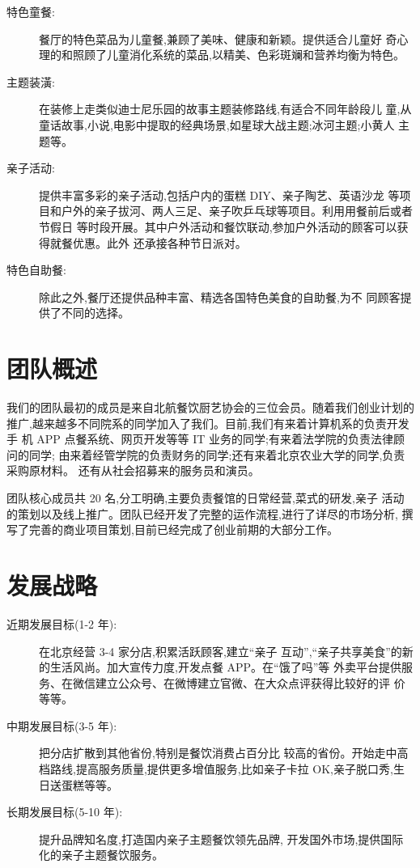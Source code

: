 \begin{description}
\item[特色童餐:] 餐厅的特色菜品为儿童餐,兼顾了美味、健康和新颖。提供适合儿童好
奇心理的和照顾了儿童消化系统的菜品,以精美、色彩斑斓和营养均衡为特色。

\item[主题装潢:] 在装修上走类似迪士尼乐园的故事主题装修路线,有适合不同年龄段儿
童,从童话故事,小说,电影中提取的经典场景,如星球大战主题;冰河主题;小黄人
主题等。

\item[亲子活动:] 提供丰富多彩的亲子活动,包括户内的蛋糕 DIY、亲子陶艺、英语沙龙
等项目和户外的亲子拔河、两人三足、亲子吹乒乓球等项目。利用用餐前后或者节假日
等时段开展。其中户外活动和餐饮联动,参加户外活动的顾客可以获得就餐优惠。此外
还承接各种节日派对。

\item[特色自助餐:] 除此之外,餐厅还提供品种丰富、精选各国特色美食的自助餐,为不
同顾客提供了不同的选择。
\end{description}

\section{团队概述}
我们的团队最初的成员是来自北航餐饮厨艺协会的三位会员。随着我们创业计划的
推广,越来越多不同院系的同学加入了我们。目前,我们有来着计算机系的负责开发手
机 APP 点餐系统、网页开发等等 IT 业务的同学;有来着法学院的负责法律顾问的同学;
由来着经管学院的负责财务的同学;还有来着北京农业大学的同学,负责采购原材料。
还有从社会招募来的服务员和演员。

团队核心成员共 20 名,分工明确,主要负责餐馆的日常经营,菜式的研发,亲子
活动的策划以及线上推广。团队已经开发了完整的运作流程,进行了详尽的市场分析,
撰写了完善的商业项目策划,目前已经完成了创业前期的大部分工作。

\section{发展战略}
\begin{description}
\item [ 近期发展目标(1-2 年):] 在北京经营 3-4 家分店,积累活跃顾客,建立“亲子
互动”,“亲子共享美食”的新的生活风尚。加大宣传力度,开发点餐 APP。在“饿了吗”等
外卖平台提供服务、在微信建立公众号、在微博建立官微、在大众点评获得比较好的评
价等等。

\item [ 中期发展目标(3-5 年):]  把分店扩散到其他省份,特别是餐饮消费占百分比
较高的省份。开始走中高档路线,提高服务质量,提供更多增值服务,比如亲子卡拉
OK,亲子脱口秀,生日送蛋糕等等。

\item [ 长期发展目标(5-10 年):]  提升品牌知名度,打造国内亲子主题餐饮领先品牌,
开发国外市场,提供国际化的亲子主题餐饮服务。
\end{description}
